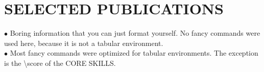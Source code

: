 \documentclass[twoside]{article}
\newcommand{\horizontalline}{
 \vspace{-6 mm}
\makebox[\linewidth]{\rule{0.8\paperwidth}{0.6pt}}
\newline
}
\begin{document}
\section*{SELECTED PUBLICATIONS} %
\horizontalline
$\bullet$ Boring information that you can just format yourself. No fancy commands were used here, because it is not a tabular environment.\\ 
$\bullet$ Most fancy commands were optimized for tabular environments. The exception is the \textbackslash score of the CORE SKILLS. 
\end{document}
